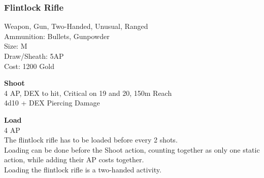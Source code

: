 \subsubsection{Flintlock Rifle}\label{weapon:flintlockRifle}
Weapon, Gun, Two-Handed, Unusual, Ranged\\
Ammunition: Bullets, Gunpowder\\
Size: M\\
Draw/Sheath: 5AP\\
Cost: 1200 Gold

\textbf{Shoot} \\
4 AP, DEX to hit, Critical on 19 and 20, 150m Reach\\
4d10 + DEX Piercing Damage

\textbf{Load} \\
4 AP\\
The flintlock rifle has to be loaded before every 2 shots.\\
Loading can be done before the Shoot action, counting together as only one static action, while adding their AP costs together.\\
Loading the flintlock rifle is a two-handed activity.
